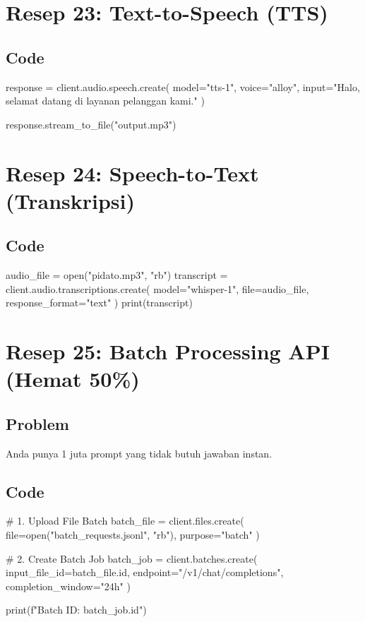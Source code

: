 \newpage

\section{Resep 23: Text-to-Speech (TTS)}

\subsection*{Code}
\begin{codeblock}[language=Python]
response = client.audio.speech.create(
    model="tts-1",
    voice="alloy",
    input="Halo, selamat datang di layanan pelanggan kami."
)

response.stream_to_file("output.mp3")
\end{codeblock}

\newpage

\section{Resep 24: Speech-to-Text (Transkripsi)}

\subsection*{Code}
\begin{codeblock}[language=Python]
audio_file = open("pidato.mp3", "rb")
transcript = client.audio.transcriptions.create(
  model="whisper-1",
  file=audio_file,
  response_format="text"
)
print(transcript)
\end{codeblock}

\newpage

\section{Resep 25: Batch Processing API (Hemat 50\%)}

\subsection*{Problem}
Anda punya 1 juta prompt yang tidak butuh jawaban instan.

\subsection*{Code}
\begin{codeblock}[language=Python]
# 1. Upload File Batch
batch_file = client.files.create(
  file=open("batch_requests.jsonl", "rb"),
  purpose="batch"
)

# 2. Create Batch Job
batch_job = client.batches.create(
  input_file_id=batch_file.id,
  endpoint="/v1/chat/completions",
  completion_window="24h"
)

print(f"Batch ID: {batch_job.id}")
\end{codeblock}

